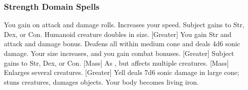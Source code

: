 \subsubsection{Strength Domain Spells}

\begin{spelllist}
     You gain  on attack and damage rolls.
     Increases your speed.
     Subject gains  to Str, Dex, or Con.
    \spellhead[2]{}
     Humanoid creature doubles in size.
    \spellhead[3]{}
    [Greater] You gain  Str and attack and damage bonus.
     Deafens all within medium cone and deals 4d6 sonic damage.
     Your size increases, and you gain combat bonuses.
    [Greater] Subject gains  to Str, Dex, or Con.
    [Mass] As , but affects multiple creatures.
    \spellhead[6]{}
    [Mass] Enlarges several creatures.
    [Greater] Yell deals 7d6 sonic damage in large cone; stuns creatures, damages objects.
     Your body becomes living iron.
    \spellhead[8]{}
    \spellhead[9]{}
    \spellhead[9]{} 
\end{spelllist}

\begin{comment}
\subsubsection{Sun Domain Spells}

\begin{spelllist}
    \spellhead[1]{Daylight} Large radius of bright light.
    \spellhead[2]{Flaming Sphere} Creates rolling ball of fire, 2d6 damage, lasts short duration.
    \spellhead[2]{Blindness/Deafness \fn{1}}
    \spellhead[3]{Plant Growth}
    \spellhead[3]{Searing Light} Ray deals 1d8/ two levels, more against undead.
    \spellhead[4]{Death Ward} Grants immunity to death spells and negative energy effects.
    \spellhead[4]{Disrupting Weapon} Melee weapon destroys undead.
    \spellhead[5]{Wall of Fire} Passing through wall deals 5d6 damage
    \spellhead[5]{Flame Strike} Smite foes with divine fire for 5d6 damage.
    \spellhead[6]{Fire Seeds} Acorns and berries become grenades and bombs.
    \spellhead[6]{Sunbeam} Multiple beams blind and deal 5d6 damage in large line.
    \spellhead[7]{Prismatic Spray} Rays hit subjects with variety of effects.
    \spellhead[7]{Sunburst} Blinds all within large radius, deals 10d6 damage.
    \spellhead[8]{Fire Storm} Deals 8d6 fire damage to enemies in large spread.
    \spellhead[8]{Prismatic Wall} Wall's colors have array of effects.
    \spellhead[9]{Meteor Swarm} Massive hail of meteors deals 9d8 damage.
    \spellhead[9]{Prismatic Sphere} As prismatic wall, but surrounds on all sides.
\end{spelllist}
1. Blindness only
\end{comment}

